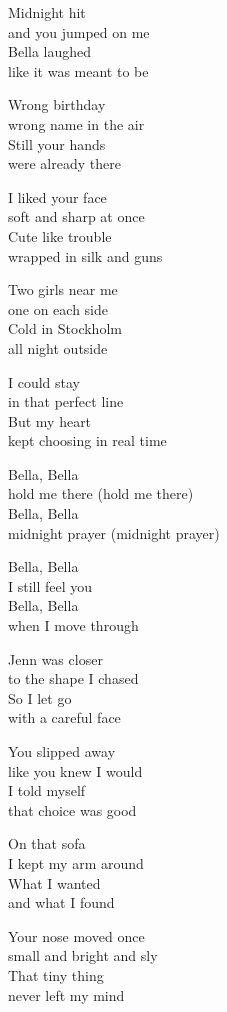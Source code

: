 \begin{lyrics}

Midnight hit\\
and you jumped on me\\
Bella laughed\\
like it was meant to be

Wrong birthday\\
wrong name in the air\\
Still your hands\\
were already there

I liked your face\\
soft and sharp at once\\
Cute like trouble\\
wrapped in silk and guns

Two girls near me\\
one on each side\\
Cold in Stockholm\\
all night outside

I could stay\\
in that perfect line\\
But my heart\\
kept choosing in real time

Bella, Bella\\
hold me there (hold me there)\\
Bella, Bella\\
midnight prayer (midnight prayer)

Bella, Bella\\
I still feel you\\
Bella, Bella\\
when I move through

Jenn was closer\\
to the shape I chased\\
So I let go\\
with a careful face

You slipped away\\
like you knew I would\\
I told myself\\
that choice was good

On that sofa\\
I kept my arm around\\
What I wanted\\
and what I found

Your nose moved once\\
small and bright and sly\\
That tiny thing\\
never left my mind


\end{lyrics}
